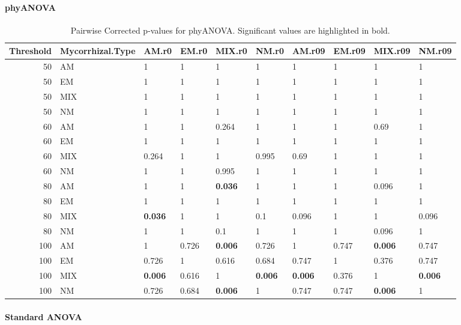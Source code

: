\documentclass[]{article}
\let\oldparagraph\paragraph
\renewcommand{\paragraph}[1]{\oldparagraph{#1}\mbox{}}
\begin{document}
\hypertarget{phyanova-1}{%
\paragraph{phyANOVA}\label{phyanova-1}}

\begin{table}[H]

\caption{\label{tab:unnamed-chunk-6}Pairwise Corrected p-values for phyANOVA. Significant values are highlighted in bold.}
\centering
\begin{tabular}{r|l|l|l|l|l|l|l|l|l}
\hline
Threshold & Mycorrhizal.Type & AM.r0 & EM.r0 & MIX.r0 & NM.r0 & AM.r09 & EM.r09 & MIX.r09 & NM.r09\\
\hline
50 & AM & 1 & 1 & 1 & 1 & 1 & 1 & 1 & 1\\
\hline
50 & EM & 1 & 1 & 1 & 1 & 1 & 1 & 1 & 1\\
\hline
50 & MIX & 1 & 1 & 1 & 1 & 1 & 1 & 1 & 1\\
\hline
50 & NM & 1 & 1 & 1 & 1 & 1 & 1 & 1 & 1\\
\hline
60 & AM & 1 & 1 & 0.264 & 1 & 1 & 1 & 0.69 & 1\\
\hline
60 & EM & 1 & 1 & 1 & 1 & 1 & 1 & 1 & 1\\
\hline
60 & MIX & 0.264 & 1 & 1 & 0.995 & 0.69 & 1 & 1 & 1\\
\hline
60 & NM & 1 & 1 & 0.995 & 1 & 1 & 1 & 1 & 1\\
\hline
80 & AM & 1 & 1 & \textbf{0.036} & 1 & 1 & 1 & 0.096 & 1\\
\hline
80 & EM & 1 & 1 & 1 & 1 & 1 & 1 & 1 & 1\\
\hline
80 & MIX & \textbf{0.036} & 1 & 1 & 0.1 & 0.096 & 1 & 1 & 0.096\\
\hline
80 & NM & 1 & 1 & 0.1 & 1 & 1 & 1 & 0.096 & 1\\
\hline
100 & AM & 1 & 0.726 & \textbf{0.006} & 0.726 & 1 & 0.747 & \textbf{0.006} & 0.747\\
\hline
100 & EM & 0.726 & 1 & 0.616 & 0.684 & 0.747 & 1 & 0.376 & 0.747\\
\hline
100 & MIX & \textbf{0.006} & 0.616 & 1 & \textbf{0.006} & \textbf{0.006} & 0.376 & 1 & \textbf{0.006}\\
\hline
100 & NM & 0.726 & 0.684 & \textbf{0.006} & 1 & 0.747 & 0.747 & \textbf{0.006} & 1\\
\hline
\end{tabular}
\end{table}

\hypertarget{standard-anova-1}{%
\paragraph{Standard ANOVA}\label{standard-anova-1}}
\end{document}
